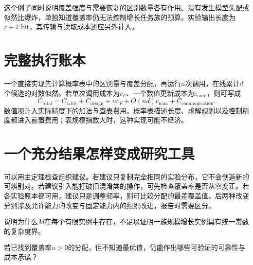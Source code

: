 这个例子同时说明覆盖强度与需要恢复的区别数量各有作用。没有发生模型失配或似然比爆炸，单独知道覆盖率仍无法控制增长任务族的预算。实验输出长度为$r+1$ bit，其传输与读取成本还应另外计入。

\section{完整执行账本}
一个直接实现先计算概率表中的区别量与覆盖分配，再运行$n$次调用，在线累计$d$个候选的对数似然。若单次调用成本为$c_F$、一个数值更新成本为$c_{\mathrm{num}}$，则可写成
\[
 C_{\mathrm{total}}=C_{\mathrm{table}}+C_{\mathrm{design}}
       +nc_F+O(nd)c_{\mathrm{num}}+C_{\mathrm{communication}}.
\]
数值项计入实际精度下的加法与查表费用。概率表描述长度、求解规划以及控制精度都进入前置费用；表规模指数大时，这种实现可能不经济。

\section{一个充分结果怎样变成研究工具}
可以用主定理检查组织建议。若建议只复制完全相同的实验分布，它不会创造新的可辨别对。若建议引入能打破旧混淆类的操作，可先检查覆盖率是否从零变正。若各实验原本都可用，建议只是调整频率，则可比较分配的最差覆盖值。后两种改变分别涉及允许能力的改变与固定能力内的组织改进，报告时需要区分。

\begin{exercise}说明为什么$M$在每个有限实例中存在，不足以证明一族规模增长实例具有统一常数的复杂度界。\end{exercise}
\begin{exercise}若已找到覆盖率$u>0$的分配，但不知道最优值，仍能作出哪些可验证的可靠性与成本承诺？\end{exercise}
